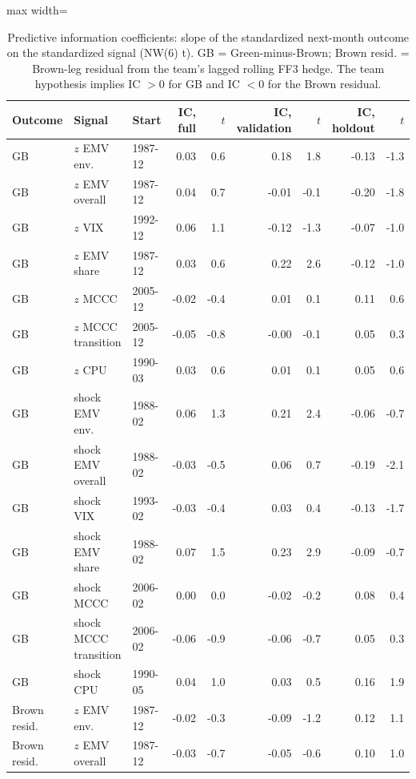 \begin{table}[H]
\centering\small
\caption{Predictive information coefficients: slope of the standardized next-month outcome on the standardized signal (NW(6) t). GB = Green-minus-Brown; Brown resid. = Brown-leg residual from the team's lagged rolling FF3 hedge. The team hypothesis implies IC $>0$ for GB and IC $<0$ for the Brown residual.}
\label{tab:m1_ic}
\begin{adjustbox}{max width=\linewidth}
\begin{tabular}{lllrrrrrr}
\toprule
Outcome & Signal & Start & IC, full & $t$ & IC, validation & $t$ & IC, holdout & $t$ \\
\midrule
GB & $z$ EMV env. & 1987-12 & 0.03 & 0.6 & 0.18 & 1.8 & -0.13 & -1.3 \\
GB & $z$ EMV overall & 1987-12 & 0.04 & 0.7 & -0.01 & -0.1 & -0.20 & -1.8 \\
GB & $z$ VIX & 1992-12 & 0.06 & 1.1 & -0.12 & -1.3 & -0.07 & -1.0 \\
GB & $z$ EMV share & 1987-12 & 0.03 & 0.6 & 0.22 & 2.6 & -0.12 & -1.0 \\
GB & $z$ MCCC & 2005-12 & -0.02 & -0.4 & 0.01 & 0.1 & 0.11 & 0.6 \\
GB & $z$ MCCC transition & 2005-12 & -0.05 & -0.8 & -0.00 & -0.1 & 0.05 & 0.3 \\
GB & $z$ CPU & 1990-03 & 0.03 & 0.6 & 0.01 & 0.1 & 0.05 & 0.6 \\
GB & shock EMV env. & 1988-02 & 0.06 & 1.3 & 0.21 & 2.4 & -0.06 & -0.7 \\
GB & shock EMV overall & 1988-02 & -0.03 & -0.5 & 0.06 & 0.7 & -0.19 & -2.1 \\
GB & shock VIX & 1993-02 & -0.03 & -0.4 & 0.03 & 0.4 & -0.13 & -1.7 \\
GB & shock EMV share & 1988-02 & 0.07 & 1.5 & 0.23 & 2.9 & -0.09 & -0.7 \\
GB & shock MCCC & 2006-02 & 0.00 & 0.0 & -0.02 & -0.2 & 0.08 & 0.4 \\
GB & shock MCCC transition & 2006-02 & -0.06 & -0.9 & -0.06 & -0.7 & 0.05 & 0.3 \\
GB & shock CPU & 1990-05 & 0.04 & 1.0 & 0.03 & 0.5 & 0.16 & 1.9 \\
Brown resid. & $z$ EMV env. & 1987-12 & -0.02 & -0.3 & -0.09 & -1.2 & 0.12 & 1.1 \\
Brown resid. & $z$ EMV overall & 1987-12 & -0.03 & -0.7 & -0.05 & -0.6 & 0.10 & 1.0 \\

\end{tabular}
\end{adjustbox}
\end{table}
